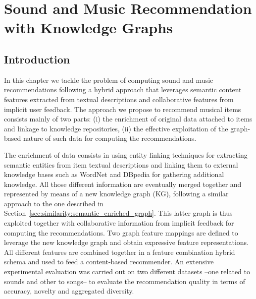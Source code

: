 
\chapter[Sound and Music Recommendation with Knowledge Graphs][Sound and Music Rec. with KGs]{Sound and Music Recommendation with Knowledge Graphs}
\label{sec:graph-rec}

\section{Introduction}
\label{sec:graph-rec:introduction}

In this chapter we tackle the problem of computing sound and music recommendations following a hybrid approach that leverages semantic content features extracted from textual descriptions and collaborative features from implicit user feedback. 
The approach we propose to recommend musical items consists mainly of two parts: (i) the enrichment of original data attached to items and linkage to knowledge repositories, (ii) the effective exploitation of the graph-based nature of such data for computing the recommendations. 

The enrichment of data consists in using entity linking techniques for extracting semantic entities from item textual descriptions and linking them to external knowledge bases such as WordNet \citep{wordnet} and DBpedia \citep{dbpedia1} for gathering additional knowledge. All those different information are eventually merged together and represented by means of a new knowledge graph (KG), following a similar approach to the one described in Section~\ref{sec:similarity:semantic_enriched_graph}.
This latter graph is thus exploited together with collaborative information from implicit feedback for computing the recommendations. Two graph feature mappings are defined to leverage the new knowledge graph and obtain expressive feature representations. All different features are combined together in a feature combination hybrid schema \citep{Burke2002} and used to feed a content-based recommender. An extensive experimental evaluation was carried out on two different datasets --one related to sounds and other to songs-- to evaluate the recommendation quality in terms of accuracy, novelty and aggregated diversity. 

